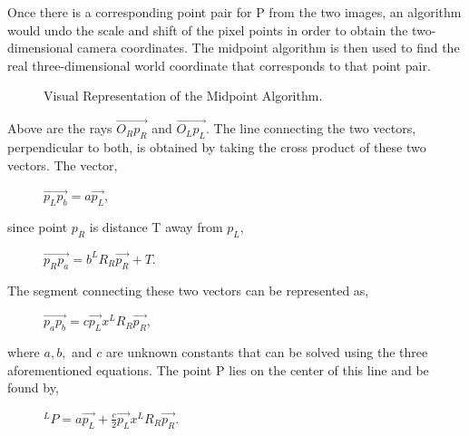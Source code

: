 \documentclass[pdftex,10.5pt]{report}
\begin{document}
Once there is a corresponding point pair for P from the two images, an algorithm would undo the scale and shift of the pixel points in order to obtain the two-dimensional camera coordinates. The midpoint algorithm is then used to find the real three-dimensional world coordinate that corresponds to that point pair.

\begin{figure}[H]
	\centering
	\caption{Visual Representation of the Midpoint Algorithm.}
\end{figure}

Above are the rays $\vec{O_{R}p_{R}}$ and $\vec{O_{L}p_{L}}$. The line connecting the two vectors, perpendicular to both, is obtained by taking the cross product of these two vectors. The vector,

\begin{figure}[H]
	\centering
	 $\vec{p_{L}p_{b}} = a\vec{p_{L}}$, 
\end{figure}	 

\noindent since point $p_{R}$ is distance T away from $p_{L}$, 

\begin{figure}[H]
	\centering
	$\vec{p_{R}p_{a}} = b^{L}R_{R}\vec{p_{R}}+T$. 
\end{figure}	

\noindent The segment connecting these two vectors can be represented as,

\begin{figure}[H]
	\centering
	$\vec{p_{a}p_{b}} = c\vec{p_{L}}x^{L}R_{R}\vec{p_{R}}$,
\end{figure}

\noindent where $a,b,$ and $c$ are unknown constants that can be solved using the three aforementioned equations. The point P lies on the center of this line and be found by,

\begin{figure}[H]
	\centering
 	$^{L}P=a\vec{p_{L}}+\frac{c}{2}\vec{p_{L}}x^{L}R_{R}\vec{p_{R}}$.
 \end{figure}
\end{document}
